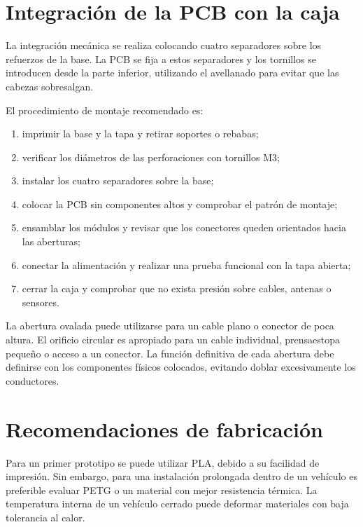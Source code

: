 \documentclass[11pt,a4paper]{article}
\begin{document}
\section{Integración de la PCB con la caja}

La integración mecánica se realiza colocando cuatro separadores sobre los refuerzos de
la base. La PCB se fija a estos separadores y los tornillos se introducen desde la parte
inferior, utilizando el avellanado para evitar que las cabezas sobresalgan.

El procedimiento de montaje recomendado es:

\begin{enumerate}
    \item imprimir la base y la tapa y retirar soportes o rebabas;
    \item verificar los diámetros de las perforaciones con tornillos M3;
    \item instalar los cuatro separadores sobre la base;
    \item colocar la PCB sin componentes altos y comprobar el patrón de montaje;
    \item ensamblar los módulos y revisar que los conectores queden orientados hacia las aberturas;
    \item conectar la alimentación y realizar una prueba funcional con la tapa abierta;
    \item cerrar la caja y comprobar que no exista presión sobre cables, antenas o sensores.
\end{enumerate}

La abertura ovalada puede utilizarse para un cable plano o conector de poca altura. El
orificio circular es apropiado para un cable individual, prensaestopa pequeño o acceso
a un conector. La función definitiva de cada abertura debe definirse con los componentes
físicos colocados, evitando doblar excesivamente los conductores.

\section{Recomendaciones de fabricación}

Para un primer prototipo se puede utilizar PLA, debido a su facilidad de impresión. Sin
embargo, para una instalación prolongada dentro de un vehículo es preferible evaluar PETG
o un material con mejor resistencia térmica. La temperatura interna de un vehículo cerrado
puede deformar materiales con baja tolerancia al calor.
\end{document}
